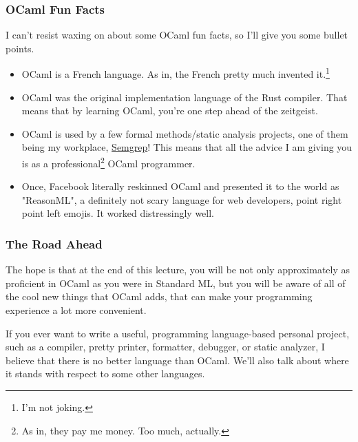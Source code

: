 \documentclass[aspectratio=169, handout]{beamer}
\begin{document}
\begin{frame}[fragile]
  \frametitle{OCaml Fun Facts}
  I can't resist waxing on about some OCaml fun facts, so I'll give you some
  bullet points.

  \begin{itemize}
    \item OCaml is a French language. As in, the French pretty much invented it.\footnote{I'm not joking.}
    \item OCaml was the original implementation language of the Rust compiler.
    That means that by learning OCaml, you're one step ahead of the zeitgeist.
    \item OCaml is used by a few formal methods/static analysis projects, one of
    them being my workplace, {\color{blue}\href{https://semgrep.dev/}{Semgrep}}! This means that
    all the advice I am giving you is as a professional\footnote{As
    in, they pay me money. Too much, actually.} OCaml programmer.
    \item Once, Facebook literally reskinned OCaml and presented it to the world
    as "ReasonML", a definitely not scary language for web developers,
    point right point left emojis. It worked distressingly well.
  \end{itemize}
\end{frame}

\begin{frame}[fragile]
  \frametitle{The Road Ahead}

  The hope is that at the end of this lecture, you will be not only
  approximately as proficient in OCaml as you were in Standard ML, but you will
  be aware of all of the cool new things that OCaml adds, that can make your
  programming experience a lot more convenient.

  \vspace{\fill}

  If you ever want to write a useful, programming language-based personal project,
  such as a compiler, pretty printer, formatter, debugger, or static analyzer,
  I believe that there is no better language than OCaml. We'll also talk about
  where it stands with respect to some other languages.
\end{frame}

\end{document}
